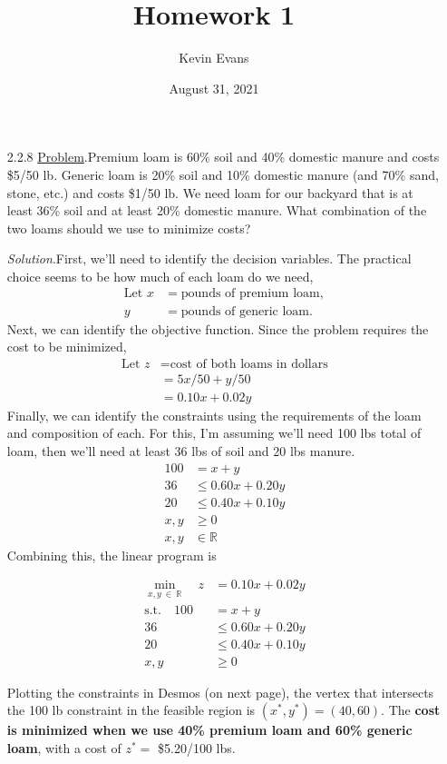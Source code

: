 \documentclass{homework}
\title{Homework 1}
\author{Kevin Evans}
\date{August 31, 2021}
\newcommand{\st}{\mathrm{s.t.}}
\begin{document}
	\maketitle
	\begin{enumerate}
		\item[2.2.8] \underline{Problem}.\quad Premium loam is 60\% soil and 40\% domestic manure and costs \$5/50 lb. Generic loam is 20\% soil and 10\% domestic manure (and 70\% sand, stone, etc.) and costs \$1/50 lb. We need loam for our backyard that is at least 36\% soil and at least 20\% domestic manure. What combination of the two loams should we use to minimize costs?
		
		\textit{Solution}.\quad First, we'll need to identify the decision variables. The practical choice seems to be how much of each loam do we need, \begin{align*}
			\text{Let } x & = \text{pounds of premium loam}, \\
			y & = \text{pounds of generic loam}.
		\end{align*}
		Next, we can identify the objective function. Since the problem requires the cost to be minimized, \begin{align*}
			\text{Let } z & = \text{cost of both loams in dollars} \\
				& = 5 x / 50 + y / 50\\
				& = 0.10x + 0.02y
		\end{align*}
		Finally, we can identify the constraints using the requirements of the loam and composition of each. For this, I'm assuming we'll need 100 lbs total of loam, then we'll need at least 36 lbs of soil and 20 lbs manure. \begin{align*}
			100 & = x + y \\
			36 & \le 0.60x + 0.20y \\
			20 & \le 0.40x + 0.10y \\
			x, y & \ge 0 \\
			x, y & \in \mathbb{R}
		\end{align*}
		Combining this, the linear program is 
		\begin{tcolorbox}
			\vspace{-1em}
			\begin{align*}
				\min_{x, y \: \in \: \mathbb{R}} \quad z & = 0.10x + 0.02 y  \\
				\st \quad 
				100 & = x + y \\
				36  & \le 0.60 x + 0.20y \\
				20 & \le 0.40 x + 0.10y \\
				x, y & \ge 0
			\end{align*}
		\end{tcolorbox}
		Plotting the constraints in Desmos (on next page), the vertex that intersects the 100 lb constraint in the feasible region is $(x^*, y^*) = (40, 60)$. The \textbf{cost is minimized when we use 40\% premium loam and 60\% generic loam}, with a cost of $z^*=$ \$5.20/100 lbs.
		

\end{enumerate}
\end{document}
